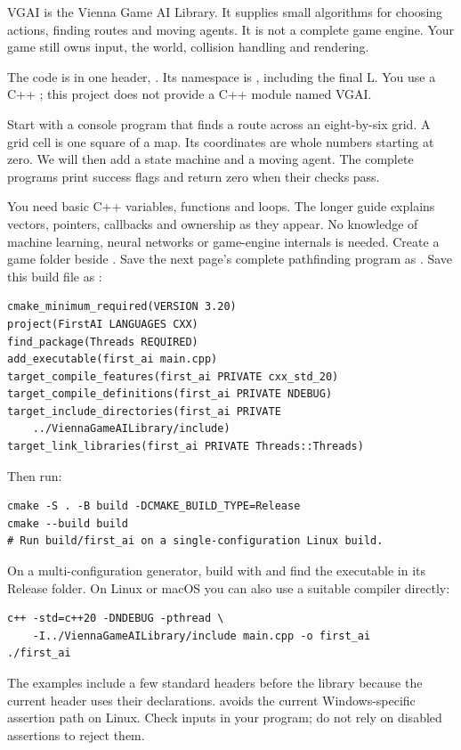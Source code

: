 \documentclass[11pt,a4paper]{article}
\begin{document}
\tableofcontents
{}
VGAI is the Vienna Game AI Library. It supplies small algorithms for choosing actions, finding routes and moving agents. It is not a complete game engine. Your game still owns input, the world, collision handling and rendering.

The code is in one header, . Its namespace is , including the final L. You use a C++ ; this project does not provide a C++ module named VGAI.

Start with a console program that finds a route across an eight-by-six grid. A grid cell is one square of a map. Its coordinates are whole numbers starting at zero. We will then add a state machine and a moving agent. The complete programs print success flags and return zero when their checks pass.

You need basic C++ variables, functions and loops. The longer guide explains vectors, pointers, callbacks and ownership as they appear. No knowledge of machine learning, neural networks or game-engine internals is needed.
Create a game folder beside . Save the next page's complete pathfinding program as . Save this build file as :\begin{lstlisting}
cmake_minimum_required(VERSION 3.20)
project(FirstAI LANGUAGES CXX)
find_package(Threads REQUIRED)
add_executable(first_ai main.cpp)
target_compile_features(first_ai PRIVATE cxx_std_20)
target_compile_definitions(first_ai PRIVATE NDEBUG)
target_include_directories(first_ai PRIVATE
    ../ViennaGameAILibrary/include)
target_link_libraries(first_ai PRIVATE Threads::Threads)
\end{lstlisting}
Then run:\begin{lstlisting}
cmake -S . -B build -DCMAKE_BUILD_TYPE=Release
cmake --build build
# Run build/first_ai on a single-configuration Linux build.
\end{lstlisting}
On a multi-configuration generator, build with  and find the executable in its Release folder. On Linux or macOS you can also use a suitable compiler directly:\begin{lstlisting}
c++ -std=c++20 -DNDEBUG -pthread \
    -I../ViennaGameAILibrary/include main.cpp -o first_ai
./first_ai
\end{lstlisting}
The examples include a few standard headers before the library because the current header uses their declarations.  avoids the current Windows-specific  assertion path on Linux. Check inputs in your program; do not rely on disabled assertions to reject them.
\end{document}
